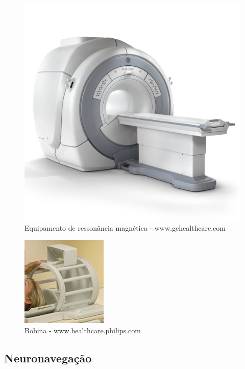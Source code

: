  
\begin{figure}[!htb]
\centering
\includegraphics[scale=0.2]{img/rm_ge.jpg}
\caption{Equipamento de ressonância magnética - www.gehealthcare.com}
\end{figure}

\begin{figure}[!htb]
\centering
\includegraphics[scale=0.8]{img/bobina.jpg}
\caption{Bobina - www.healthcare.philips.com}
\end{figure}

\subsection{Neuronavegação}
\label{sec:neuronavegador_intro}

